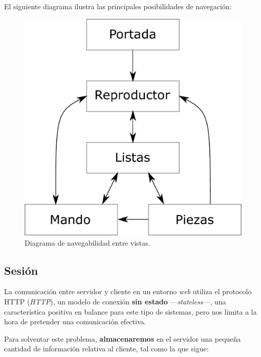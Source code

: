 El siguiente diagrama ilustra las principales posibilidades de navegación:

\smallskip

\begin{figure}[H]
	\noindent \begin{centering}
		\includegraphics[width=\linewidth/2]{capitulo4/navegacion}
		\par\end{centering}
	\smallskip
	\caption{\label{fig:navegacion} Diagrama de navegabilidad entre vistas.}
\end{figure} 

\smallskip

\subsection{Sesión}
\label{subsec:session}

La comunicación entre servidor y cliente en un entorno \textit{web} utiliza el protocolo \acrshort{HTTP} (\textit{\acrlong{HTTP}}), un modelo de conexión \textbf{sin estado} ---\textit{stateless}---, una característica positiva en balance para este tipo de sistemas, pero nos limita a la hora de pretender una comunicación efectiva.

Para solventar este problema, \textbf{almacenaremos} en el servidor una pequeña cantidad de información relativa al cliente, tal como la que sigue:

